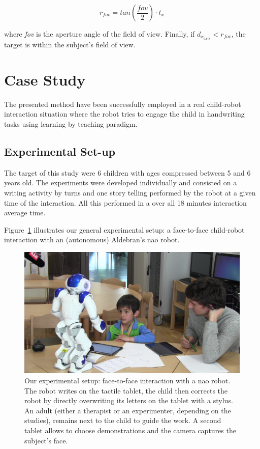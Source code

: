 \documentclass{sig-alternate}
\begin{document}
\begin{equation}
r_{fov} = tan\left(\frac{fov}{2}\right) \cdot t_x
\label{eq:fovtf}
\end{equation}

where \textit{fov} is the aperture angle of the field of view. Finally, if $ d_{x_{axis}}<r_{fov} $, the target is within the subject's field of view.


\section{Case Study}
The presented method have been successfully employed in a real child-robot interaction situation where the robot tries to engage the child in handwriting tasks using learning by teaching paradigm.
\subsection{Experimental Set-up}

The target of this study were 6 children with ages compressed between 5 and 6 years old. The experiments were developed individually and consisted on a writing activity by turns and one story telling performed by the robot at a given time of the interaction. All this performed in a over all 18 minutes interaction average time.

Figure~\ref{fig:realSetup} illustrates our general experimental setup: a
face-to-face child-robot interaction with an (autonomous) Aldebran's {\sc nao}
robot.

\begin{figure}[h!]
    \centering
    \includegraphics[width=1\columnwidth]{realSetup}
    \caption{\small Our experimental setup: face-to-face interaction with a {\sc
            nao} robot.  The robot writes on the tactile tablet, the child then
            corrects the robot by directly overwriting its letters on the tablet
            with a stylus. An adult (either a therapist or an experimenter,
            depending on the studies), remains next to the child to guide the work. 
            A second tablet allows to choose demonstrations and the camera captures the subject's face.}
    \label{fig:realSetup}
\end{figure}
\end{document}
